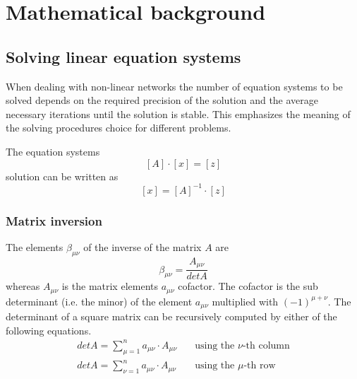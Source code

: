 %
%
%
%

\chapter{Mathematical background}

\section{Solving linear equation systems}
\label{sec:linEQS}

When dealing with non-linear networks the number of equation systems
to be solved depends on the required precision of the solution and the
average necessary iterations until the solution is stable.  This
emphasizes the meaning of the solving procedures choice for different
problems.

\addvspace{12pt}

The equation systems
\begin{equation}
\left[A\right] \cdot \left[x\right] = \left[z\right]
\end{equation}
solution can be written as
\begin{equation}
\left[x\right] = \left[A\right]^{-1} \cdot \left[z\right]
\end{equation}

\subsection{Matrix inversion}

The elements $\beta_{\mu\nu}$ of the inverse of the matrix $A$ are
\begin{equation}
\beta_{\mu\nu} = \frac{A_{\mu\nu}}{det A}
\end{equation}
whereas $A_{\mu\nu}$ is the matrix elements $a_{\mu\nu}$ cofactor.
The cofactor is the sub determinant (i.e. the minor) of the element
$a_{\mu\nu}$ multiplied with $(-1)^{\mu + \nu}$.  The determinant of a
square matrix can be recursively computed by either of the following
equations.
\begin{align}
det A = \sum_{\mu = 1}^{n} a_{\mu\nu}\cdot A_{\mu\nu}
\quad &\text{using the $\nu$-th column}\\
det A = \sum_{\nu = 1}^{n} a_{\mu\nu}\cdot A_{\mu\nu}
\quad &\text{using the $\mu$-th row}
\end{align}


